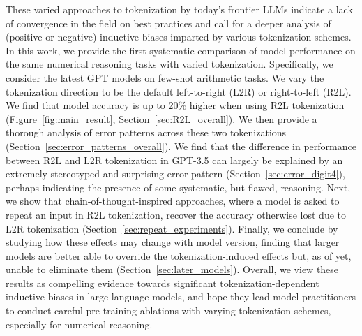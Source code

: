 \documentclass{article}
\theoremstyle{plain}
\theoremstyle{definition}
\theoremstyle{remark}
\begin{document}
These varied approaches to tokenization by today's frontier LLMs indicate a lack of convergence in the field on best practices and call for a deeper analysis of (positive or negative) inductive biases imparted by various tokenization schemes. In this work, we provide the first systematic comparison of model performance on the same numerical reasoning tasks with varied tokenization. Specifically, we consider the latest GPT models on few-shot arithmetic tasks. We vary the tokenization direction to be the default left-to-right (L2R) or right-to-left (R2L). We find that model accuracy is up to 20\% higher when using R2L tokenization (Figure~\ref{fig:main_result}, Section~\ref{sec:R2L_overall}). We then provide a thorough analysis of error patterns across these two tokenizations (Section~\ref{sec:error_patterns_overall}). We find that the difference in performance between R2L and L2R tokenization in GPT-3.5 can largely be explained by an extremely stereotyped and surprising error pattern (Section~\ref{sec:error_digit4}), perhaps indicating the presence of some systematic, but flawed, reasoning. Next, we show that chain-of-thought-inspired approaches, where a model is asked to repeat an input in R2L tokenization, recover the accuracy otherwise lost due to L2R tokenization (Section~\ref{sec:repeat_experiments}). Finally, we conclude by studying how these effects may change with model version, finding that larger models are better able to override the tokenization-induced effects but, as of yet, unable to eliminate them (Section~\ref{sec:later_models}). Overall, we view these results as compelling evidence towards significant tokenization-dependent inductive biases in large language models, and hope they lead model practitioners to conduct careful pre-training ablations with varying tokenization schemes, especially for numerical reasoning.
\end{document}

